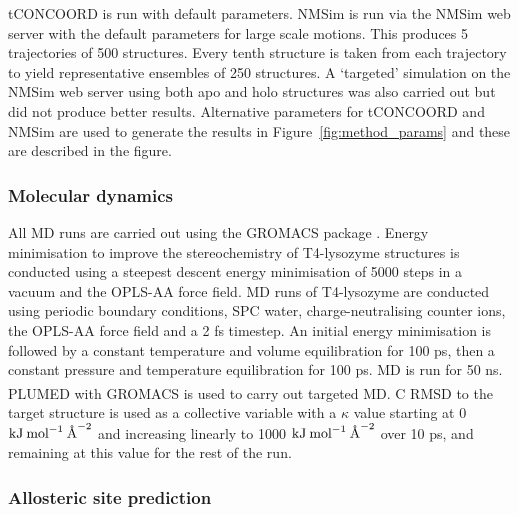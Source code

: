 tCONCOORD \cite{Seeliger2007} is run with default parameters.
NMSim is run via the NMSim web server \cite{Kruger2012} with the default parameters for large scale motions.
This produces 5 trajectories of 500 structures. Every tenth structure is taken from each trajectory to yield representative ensembles of 250 structures.
A `targeted' simulation on the NMSim web server using both apo and holo structures was also carried out but did not produce better results.
Alternative parameters for tCONCOORD and NMSim are used to generate the results in Figure~\ref{fig:method_params} and these are described in the figure.


\subsubsection{Molecular dynamics}

All MD runs are carried out using the GROMACS package \cite{Abraham2015}.
Energy minimisation to improve the stereochemistry of T4-lysozyme structures is conducted using a steepest descent energy minimisation of 5000 steps in a vacuum and the OPLS-AA force field.
MD runs of T4-lysozyme are conducted using periodic boundary conditions, SPC water, charge-neutralising counter ions, the OPLS-AA force field and a 2 fs timestep.
An initial energy minimisation is followed by a constant temperature and volume equilibration for 100 ps, then a constant pressure and temperature equilibration for 100 ps.
MD is run for 50 ns.
PLUMED \cite{Tribello2014} with GROMACS is used to carry out targeted MD.
C\textsuperscript{\textalpha} RMSD to the target structure is used as a collective variable with a $\kappa$ value starting at 0 $\textup{kJ} \: \textup{mol}^{-1} \: \textup{\AA}^{-2}$ and increasing linearly to 1000 $\textup{kJ} \: \textup{mol}^{-1} \: \textup{\AA}^{-2}$ over 10 ps, and remaining at this value for the rest of the run.


\subsubsection{Allosteric site prediction}


